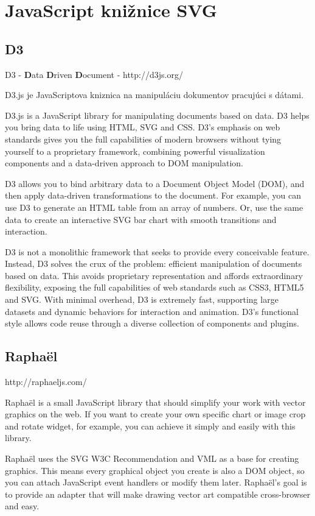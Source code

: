 \section{JavaScript knižnice SVG}

\subsection{D3}
D3  - \textbf{D}ata \textbf{D}riven \textbf{D}ocument -  http://d3js.org/

D3.js je JavaScriptova kniznica na manipuláciu dokumentov pracujúci s dátami. 

D3.js is a JavaScript library for manipulating documents based on data. D3 helps you bring data to life using HTML, SVG and CSS. D3’s emphasis on web standards gives you the full capabilities of modern browsers without tying yourself to a proprietary framework, combining powerful visualization components and a data-driven approach to DOM manipulation. 

D3 allows you to bind arbitrary data to a Document Object Model (DOM), and then apply data-driven transformations to the document. For example, you can use D3 to generate an HTML table from an array of numbers. Or, use the same data to create an interactive SVG bar chart with smooth transitions and interaction.

D3 is not a monolithic framework that seeks to provide every conceivable feature. Instead, D3 solves the crux of the problem: efficient manipulation of documents based on data. This avoids proprietary representation and affords extraordinary flexibility, exposing the full capabilities of web standards such as CSS3, HTML5 and SVG. With minimal overhead, D3 is extremely fast, supporting large datasets and dynamic behaviors for interaction and animation. D3’s functional style allows code reuse through a diverse collection of components and plugins. 

\subsection{Raphaël}
http://raphaeljs.com/

 Raphaël is a small JavaScript library that should simplify your work with vector graphics on the web. If you want to create your own specific chart or image crop and rotate widget, for example, you can achieve it simply and easily with this library.

Raphaël  uses the SVG W3C Recommendation and VML as a base for creating graphics. This means every graphical object you create is also a DOM object, so you can attach JavaScript event handlers or modify them later. Raphaël’s goal is to provide an adapter that will make drawing vector art compatible cross-browser and easy.

